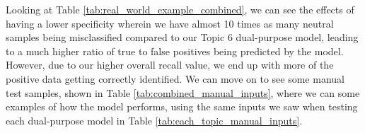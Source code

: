 \begin{table}[ht]
    \centering
    \vspace{5pt}
    \caption{Example classification distributions for different levels of expected positive data out of an input of \textbf{1,000,000} samples. Specificity (\textbf{98.83\%}) and Recall (\textbf{64.49\%}) values are achieved from the multi-purpose secondary model with a training ratio of \textbf{100:100:30}.}
    \label{tab:real_world_example_combined}
\end{table}

Looking at Table \ref{tab:real_world_example_combined}, we can see the effects of having a lower specificity wherein we have almost 10 times as many neutral samples being misclassified compared to our Topic 6 dual-purpose model, leading to a much higher ratio of true to false positives being predicted by the model. However, due to our higher overall recall value, we end up with more of the positive data getting correctly identified. We can move on to see some manual test samples, shown in Table \ref{tab:combined_manual_inputs}, where we can some examples of how the model performs, using the same inputs we saw when testing each dual-purpose model in Table \ref{tab:each_topic_manual_inputs}.


